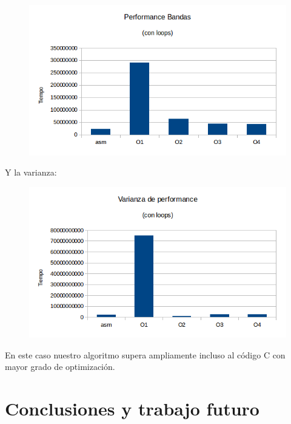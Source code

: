 \documentclass[a4paper]{article}
\begin{document}
\begin{figure}[h!]
  \begin{center}
  \includegraphics[scale=0.66]{Graficos1.4/ban/PSO.png}
  \label{nombreparareferenciar11}
  \end{center}
\end{figure}

Y la varianza:

\begin{figure}[h!]
  \begin{center}
  \includegraphics[scale=0.66]{Graficos1.4/ban/VSO.png}
  \label{nombreparareferenciar12}
  \end{center}
\end{figure}

En este caso nuestro algoritmo supera ampliamente incluso al código C con mayor grado de optimización.


\section{Conclusiones y trabajo futuro}
\end{document}
